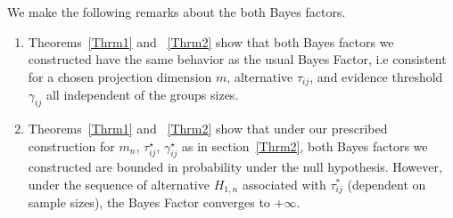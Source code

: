 \documentclass[times,sort&compress,3p]{elsarticle}
\theoremstyle{plain}%
\theoremstyle{definition}
\def\refhg{\hangindent=20pt\hangafter=1}
\def\refmark{\par\vskip 2mm\noindent\refhg}
\def\refhg{\hangindent=20pt\hangafter=1}
\def\refmark{\par\vskip 2mm\noindent\refhg}
\def\refhg{\hangindent=20pt\hangafter=1}
\def\refmark{\par\vskip 2mm\noindent\refhg}
\def\refhg{\hangindent=20pt\hangafter=1}
\def\refmark{\par\vskip 2mm\noindent\refhg}
\begin{document}
\refmark{\bf Remarks:}
We make the following remarks about the both Bayes factors. 
\begin{enumerate}
    \item Theorems~\ref{Thrm1} and ~\ref{Thrm2} show that both Bayes factors we constructed have the same behavior as the usual Bayes Factor, i.e consistent for a chosen projection dimension $m$, alternative $\tau_{ij}$, and evidence threshold $\gamma_{ij}$ all independent of the groups sizes. 
    \item Theorems~\ref{Thrm1} and ~\ref{Thrm2} show that under our prescribed construction for $m_n$, $\tau^{\star}_{ij}$, $\gamma^{\star}_{ij}$ as in section~\ref{Thrm2}, both Bayes factors we constructed are bounded in probability under the null hypothesis. However, under the sequence of alternative $H_{1,n}$ associated with $\tau^{*}_{ij}$ (dependent on sample sizes), the Bayes Factor converges to $+\infty$.
\end{enumerate}
\end{document}
